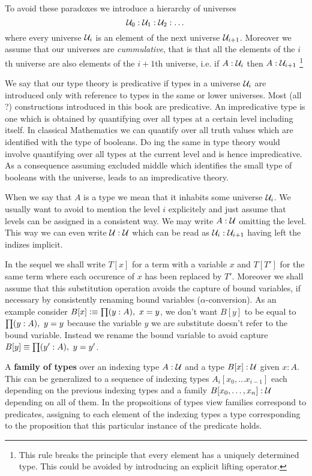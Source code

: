 {To avoid these paradoxes we introduce a hierarchy of universes
\[ \mathcal{U}_0 : \mathcal{U}_1 : \mathcal{U}_2 : \dots \]
where every universe $\mathcal{U}_i$ is an element of the next universe
$\mathcal{U}_{i+1}$. Moreover we assume that our universes are
\emph{cummulative}, that is that all the elements of the $i$th
universe are also elements of the $i+1$th universe, i.e. if
$A:\mathcal{U}_i$ then $A:\mathcal{U}_{i+1}$
\footnote{This rule breaks the principle that every element
  has a uniquely determined type. This could be avoided by introducing
  an explicit lifting operator.}

We say that our type theory is predicative if types in a universe
$\mathcal{U}_i$ are introduced only with reference to types in the same or
lower universes. Most (all ?) constructions introduced in this book
are predicative. An impredicative type is one which is obtained by
quantifying over all types at a certain level including itself. In
classical Mathematics we can quantify over all truth values which are
identified with the type of booleans. Do ing the same in type theory
would involve quantifying over all types at the current level and is
hence impredicative. As a consequence assuming excluded middle which
identifies the small type of booleans with the universe, leads to an
impredicative theory.

When we say that $A$ is a type we mean that it inhabits some universe
$\mathcal{U}_i$. We usually want to avoid to mention the level $i$ explicitely
and just assume that levels can be assigned in a consistent way. We
may write $A:\mathcal{U}$ omitting the level. This way we can even write
$\mathcal{U}:\mathcal{U}$ which can be read as $\mathcal{U}_i:\mathcal{U}_{i+1}$ having left the
indizes implicit. 

In the sequel we shall write $T[x]$ for a term with a variable $x$ and
$T[T']$ for the same term where each occurence of $x$ has been
replaced by $T'$. Moreover we shall assume that this substitution
operation avoids the capture of bound variables, if necessary by
consistently renaming bound variables ($\alpha$-conversion).
As an example consider $B[x] \defeq \prd{y:A}x = y$, we don't want
$B[y]$ to be equal to $\prd{y:A}y = y$ because the variable $y$ we are
substitute doesn't refer to the bound variable. Instead we rename the
bound variable to avoid capture $B[y] \jdeq \prd{y':A}y = y'$.

A \textbf{family of types} over an indexing type $A:\mathcal{U}$ and a 
type $B[x] : \mathcal{U}$ given $x:A$. This can be generalized to a sequence of indexing
types $A_i[x_0,\dots x_{i-1}]$ each depending on the previous indexing
types and a family $B[x_0,\dots,x_n] : \mathcal{U}$ depending on all of them. In the
propsoitions of types view families correspond to predicates,
assigning to each element of the indexing types a type corresponding
to the proposition that this particular instance of the predicate holds.

}
